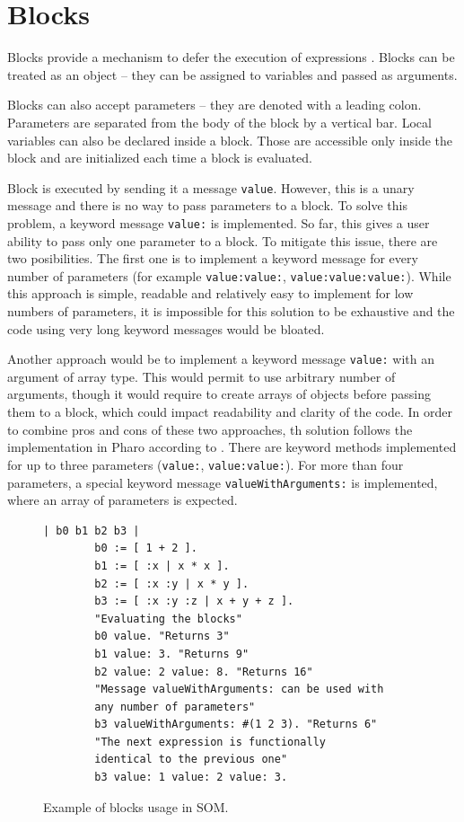 \documentclass[thesis=M,english]{FITthesis}[2019/12/23]
\begin{document}
\section{Blocks}
Blocks provide a mechanism to defer the execution of expressions \cite{pharo-by-example}.
Blocks can be treated as an object -- they can be assigned to variables and
passed as arguments. 

Blocks can also accept parameters -- they are denoted with a leading colon. Parameters are separated from the body
of the block by a vertical bar. Local variables can also be declared inside a block. Those are accessible only inside
the block and are initialized each time a block is evaluated.

Block is executed by sending it a message \texttt{value}. However, this is a unary message and there is no way
to pass parameters to a block. To solve this problem, a keyword message \texttt{value:} is implemented. So far, this
gives a user ability to pass only one parameter to a block. To mitigate this issue, there are two posibilities. The first one
is to implement a keyword message for every number of parameters (for example \texttt{value:value:}, 
\texttt{value:value:value:}). While this approach is simple, readable and relatively easy to implement for low
numbers of parameters, it is impossible for this solution to be exhaustive and the code using very long keyword
messages would be bloated.

Another approach would be to implement a keyword message \texttt{value:} with an argument of array type. This would
permit to use arbitrary number of arguments, though it would require to create arrays of objects before passing them
to a block, which could impact readability and clarity of the code. In order to combine pros and cons of these two
approaches, th solution follows the implementation in Pharo according to \cite[p.~65]{pharo-by-example}. 
There are keyword methods implemented for up to three parameters (\texttt{value:}, \texttt{value:value:}). For more
than four parameters, a special keyword message \texttt{valueWithArguments:} is implemented, where an array of
parameters is expected.

\begin{figure}[h!]
	\caption{Example of blocks usage in SOM.}
	\begin{lstlisting}[language=Smalltalk]
		| b0 b1 b2 b3 |
		b0 := [ 1 + 2 ].
		b1 := [ :x | x * x ].
		b2 := [ :x :y | x * y ].
		b3 := [ :x :y :z | x + y + z ].
		"Evaluating the blocks"
		b0 value. "Returns 3"
		b1 value: 3. "Returns 9"
		b2 value: 2 value: 8. "Returns 16"
		"Message valueWithArguments: can be used with 
		any number of parameters"
		b3 valueWithArguments: #(1 2 3). "Returns 6"
		"The next expression is functionally 
		identical to the previous one"
		b3 value: 1 value: 2 value: 3.
	\end{lstlisting}
\end{figure}
\end{document}
